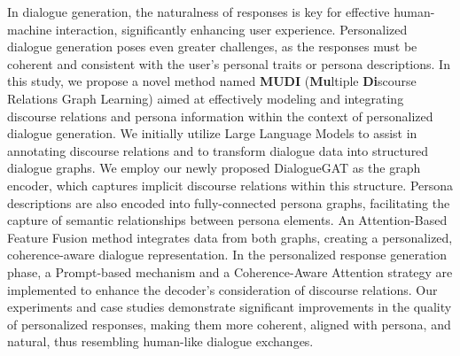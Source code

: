 \StartAbstract
In dialogue generation, the naturalness of responses is key for effective human-machine interaction, significantly enhancing user experience. Personalized dialogue generation poses even greater challenges, as the responses must be coherent and consistent with the user's personal traits or persona descriptions. In this study, we propose a novel method named \textbf{MUDI} (\textbf{Mu}ltiple \textbf{Di}scourse Relations Graph Learning) aimed at effectively modeling and integrating discourse relations and persona information within the context of personalized dialogue generation. We initially utilize Large Language Models to assist in annotating discourse relations and to transform dialogue data into structured dialogue graphs. We employ our newly proposed DialogueGAT as the graph encoder, which captures implicit discourse relations within this structure. Persona descriptions are also encoded into fully-connected persona graphs, facilitating the capture of semantic relationships between persona elements. An Attention-Based Feature Fusion method integrates data from both graphs, creating a personalized, coherence-aware dialogue representation. In the personalized response generation phase, a Prompt-based mechanism and a Coherence-Aware Attention strategy are implemented to enhance the decoder's consideration of discourse relations. Our experiments and case studies demonstrate significant improvements in the quality of personalized responses, making them more coherent, aligned with persona, and natural, thus resembling human-like dialogue exchanges.

